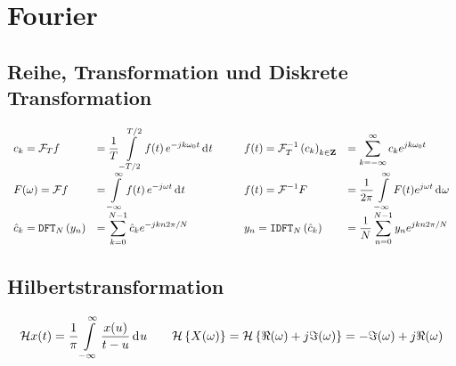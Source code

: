\section{Fourier}
\subsection{Reihe, Transformation und Diskrete Transformation}
\[
  \everymath={\displaystyle}
  \begin{array}{l l @{\hspace{1cm}} l l}
    c_k = \fourier_T f &=
    \frac{1}{T} \int\limits_{-T/2}^{T/2} f(t) \, e^{-jk\omega_0 t} \di{t}
    &
      f(t) = \ifourier_T \left( c_k \right)_{k\in\mathbf{Z}} &=
      \sum_{k=-\infty}^{\infty} c_k e^{jk\omega_0 t}
      \\

    F(\omega) = \fourier f &=
    \int\limits_{-\infty}^{\infty} f(t) \, e^{-j\omega t} \di{t}
    &
      f(t) = \ifourier F &=
      \frac{1}{2\pi} \int\limits_{-\infty}^\infty F(t) e^{j\omega t} \di{\omega}
      \\

    \hat{c}_k = \mathtt{DFT}_N \left( y_n \right) &=
    \sum_{k=0}^{N-1} \hat{c}_k e^{-jkn2\pi /N}
      &
      y_n = \mathtt{IDFT}_N \left( \hat{c}_k \right) &=
      \frac{1}{N}\sum_{n=0}^{N-1} y_n e^{jkn2\pi /N}
  \end{array}
\]

\subsection{Hilbertstransformation}
\[
  \mathcal{H} x(t) = \frac{1}{\pi} \int\limits_{-\infty}^{\infty}
    \frac{x(u)}{t - u} \,\mathrm{d}^{} u
  \qquad
  \mathcal{H} \left\{ X(\omega) \right\}
    = \mathcal{H} \left\{ \Re(\omega) + j\Im(\omega) \right\}
    = - \Im(\omega) + j\Re(\omega)
\]
